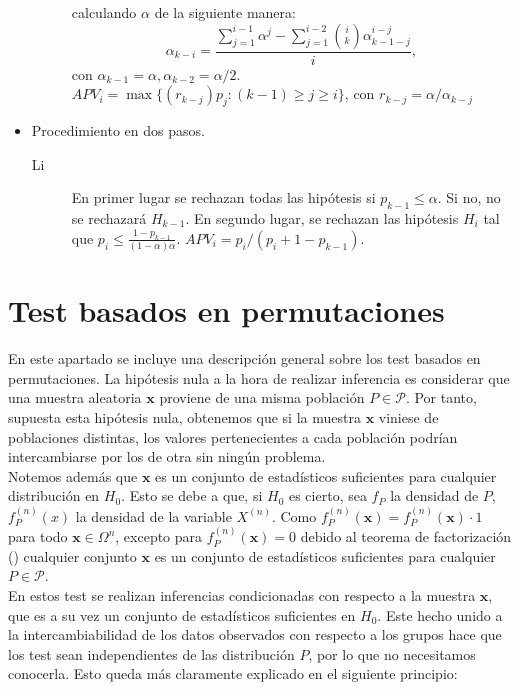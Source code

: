\begin{itemize}
\begin{description}
		calculando $\alpha$ de la siguiente manera:
		\[ 
			\alpha_{k-i} = \frac{
								\sum\limits_{j=1}^{i-1}
									\alpha^j
								- \sum\limits_{j=1}^{i-2}
									{i \choose k}
									\alpha_{k-1-j}^{i-j}
						}{i},
		\]
		con $\alpha_{k-1} = \alpha, \alpha_{k-2}= \alpha/2$. 
		$APV_i = \max \{(r_{k-j})p_j: (k-1) \geq j \geq 
		i \}$, con $r_{k-j}=\alpha/\alpha_{k-j}$
	\end{description}	
\item Procedimiento en dos pasos.
	\begin{description}
	\item[Li] En primer lugar se rechazan todas las 
		hipótesis si $p_{k-1} \leq \alpha$. Si no, 
		no se rechazará $H_{k-1}$. En segundo lugar, se 
		rechazan las hipótesis $H_{i}$ tal que 
		$p_i \leq \frac{1-p_{k-1}}{(1-\alpha)\alpha}$.
		$APV_i = p_i/(p_i + 1 - p_{k-1})$.	
	\end{description}	 
\end{itemize}

\section{Test basados en permutaciones}
	
	En este apartado se incluye una descripción general sobre 
los test basados en permutaciones. La hipótesis nula a la 
hora de realizar inferencia es considerar que una muestra 
aleatoria $\mathbf{x}$ proviene de una misma población 
$P \in \mathcal{P}$. Por tanto, supuesta esta hipótesis nula, 
obtenemos que si la muestra $\mathbf{x}$ viniese de 
poblaciones distintas, los valores pertenecientes a cada 
población podrían intercambiarse por los de otra sin ningún 
problema.\\
	Notemos además que $\mathbf{x}$ es un conjunto de 
estadísticos suficientes para cualquier distribución en 
$H_0$. Esto se debe a que, si $H_0$ es cierto, sea $f_P$ la 
densidad de $P$, $f_P^{(n)}(x)$ la densidad de la variable 
$X^{(n)}$. Como $f_P^{(n)}(\mathbf{x}) = f_P^{(n)}(\mathbf{x}) 
\cdot 1$ para todo $\mathbf{x} \in \Omega^n$, excepto para 
$f_P^{(n)}(\mathbf{x}) = 0$ debido al teorema de 
factorización (\cite[p. 167]{ibarrola1993principios}) cualquier conjunto $\mathbf{x}$ 
es un conjunto 
de estadísticos suficientes para cualquier $P \in 
\mathcal{P}$.\\
	En estos test se realizan inferencias condicionadas con
respecto a la muestra $\mathbf{x}$, que es a su vez un conjunto de 
estadísticos suficientes en $H_0$. Este hecho unido a la 
intercambiabilidad de los datos observados con respecto a los 
grupos hace que los test sean independientes de las 
distribución $P$, por lo que no necesitamos conocerla. Esto 
queda más claramente explicado en el siguiente principio:

